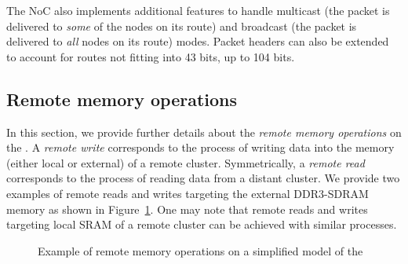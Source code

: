 \documentclass[main.tex]{subfiles}
\begin{document}

The NoC also implements additional features to handle multicast (the packet is
delivered to \emph{some} of the nodes on its route) and broadcast (the packet
is delivered to \emph{all} nodes on its route) modes. Packet headers can also
be extended to account for routes not fitting into 43 bits, up to 104 bits.


\subsection{Remote memory operations}
In this section, we provide further details about the \emph{remote memory
operations} on the \mppalong. A \emph{remote write} corresponds to the process
of writing data into the memory (either local or external) of a remote cluster.
Symmetrically, a \emph{remote read} corresponds to the process of reading data
from a distant cluster. We provide two examples of remote reads and writes
targeting the external DDR3-SDRAM memory as shown in
Figure~\ref{systemModel_MPPAremoteMem}. One may note that remote reads and
writes targeting local SRAM of a remote cluster can be achieved with similar
processes.


\begin{figure}
    \begin{center}
        
        \caption{Example of remote memory operations on a simplified model of
        the \mppalong}
        \label{systemModel_MPPAremoteMem}
    \end{center}
\end{figure}
\end{document}
